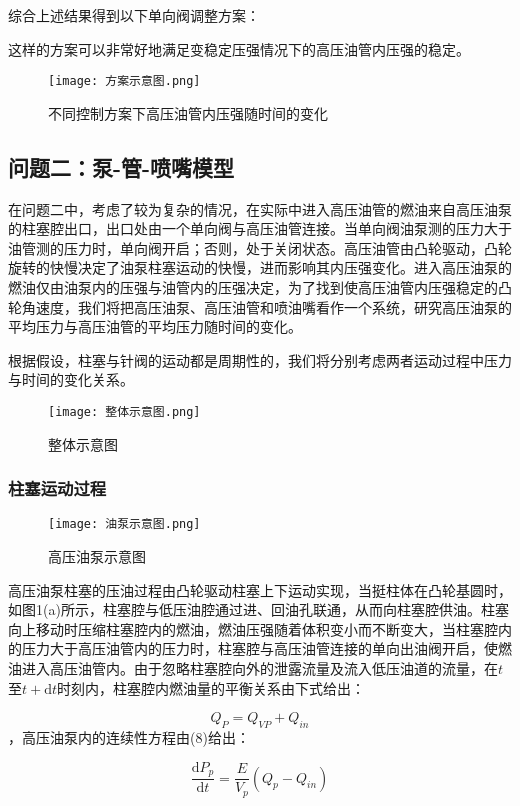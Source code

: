 \documentclass[withoutpreface,bwprint]{cumcmthesis} %
\begin{document}
			综合上述结果得到以下单向阀调整方案：
			
			
			这样的方案可以非常好地满足变稳定压强情况下的高压油管内压强的稳定。
			\begin{figure}[!htbp]
				\centering
				\texttt{[image: 方案示意图.png]}
				\caption{不同控制方案下高压油管内压强随时间的变化}
			\end{figure}
			\subsection{问题二：泵-管-喷嘴模型}
			在问题二中，考虑了较为复杂的情况，在实际中进入高压油管的燃油来自高压油泵的柱塞腔出口，出口处由一个单向阀与高压油管连接。当单向阀油泵测的压力大于油管测的压力时，单向阀开启；否则，处于关闭状态。高压油管由凸轮驱动，凸轮旋转的快慢决定了油泵柱塞运动的快慢，进而影响其内压强变化。进入高压油泵的燃油仅由油泵内的压强与油管内的压强决定，为了找到使高压油管内压强稳定的凸轮角速度，我们将把高压油泵、高压油管和喷油嘴看作一个系统，研究高压油泵的平均压力与高压油管的平均压力随时间的变化。
			
			根据假设，柱塞与针阀的运动都是周期性的，我们将分别考虑两者运动过程中压力与时间的变化关系。
			\begin{figure}[!htbp]
				\centering
				\texttt{[image: 整体示意图.png]}
				\caption{整体示意图}
			\end{figure}
			\subsubsection{柱塞运动过程}
			\begin{figure}[!htbp]
				\centering
				\texttt{[image: 油泵示意图.png]}
				\caption{高压油泵示意图}
			\end{figure}
			
			高压油泵柱塞的压油过程由凸轮驱动柱塞上下运动实现，当挺柱体在凸轮基圆时，如图1(a)所示，柱塞腔与低压油腔通过进、回油孔联通，从而向柱塞腔供油。柱塞向上移动时压缩柱塞腔内的燃油，燃油压强随着体积变小而不断变大，当柱塞腔内的压力大于高压油管内的压力时，柱塞腔与高压油管连接的单向出油阀开启，使燃油进入高压油管内。由于忽略柱塞腔向外的泄露流量及流入低压油道的流量，在$t$至$t + \mathrm{d}t$时刻内，柱塞腔内燃油量的平衡关系由下式给出：
			
			\begin{equation}Q_P = Q_{VP} + Q_{in}\end{equation}，高压油泵内的连续性方程由(8)给出：
			
			\begin{equation}\frac{\mathrm{d}P_p}{\mathrm{d}t} = \frac{E}{V_p}(Q_{p} - Q_{in})\end{equation}
			
\end{document}
